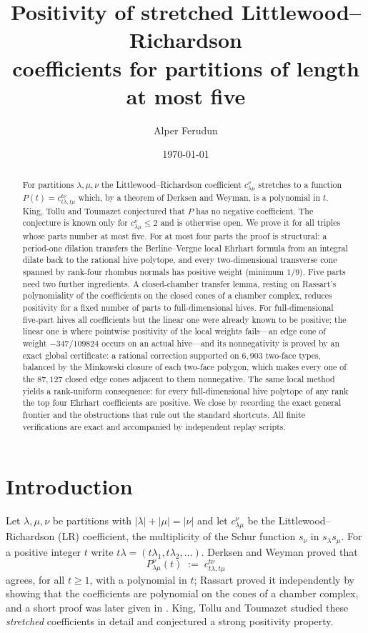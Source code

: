 \documentclass[11pt]{amsart}
\title[Stretched Littlewood--Richardson positivity, at most five parts]{Positivity of stretched Littlewood--Richardson\\ coefficients for partitions of length at most five}
\author{Alper Ferudun}
\date{\today}
\theoremstyle{definition}
\newcommand{\lam}{\lambda}
\begin{document}
\begin{abstract}
For partitions $\lam,\mu,\nu$ the Littlewood--Richardson coefficient
$c^{\nu}_{\lam\mu}$ stretches to a function $P(t)=c^{t\nu}_{t\lam,t\mu}$ which,
by a theorem of Derksen and Weyman, is a polynomial in $t$. King, Tollu and
Toumazet conjectured that $P$ has no negative coefficient. The conjecture is
known only for $c^{\nu}_{\lam\mu}\le 2$ and is otherwise open. We prove it for
all triples whose parts number at most five. For at most four parts the proof
is structural: a period-one dilation transfers the Berline--Vergne local Ehrhart
formula from an integral dilate back to the rational hive polytope, and every
two-dimensional transverse cone spanned by rank-four rhombus normals has
positive weight (minimum $1/9$). Five parts need two further ingredients. A
closed-chamber transfer lemma, resting on Rassart's polynomiality of the
coefficients on the closed cones of a chamber complex, reduces positivity for a
fixed number of parts to full-dimensional hives. For full-dimensional five-part
hives all coefficients but the linear one were already known to be positive;
the linear one is where pointwise positivity of the local weights fails---an
edge cone of weight $-347/109824$ occurs on an actual hive---and its
nonnegativity is proved by an exact global certificate: a rational correction
supported on $6{,}903$ two-face types, balanced by the Minkowski closure of each
two-face polygon, which makes every one of the $87{,}127$ closed edge cones
adjacent to them nonnegative. The same local method yields a rank-uniform
consequence: for every full-dimensional hive polytope of any rank the top four
Ehrhart coefficients are positive. We close by recording the exact general
frontier and the obstructions that rule out the standard shortcuts. All finite
verifications are exact and accompanied by independent replay scripts.
\end{abstract}

\maketitle

\section{Introduction}

Let $\lam,\mu,\nu$ be partitions with $|\lam|+|\mu|=|\nu|$ and let
$c^{\nu}_{\lam\mu}$ be the Littlewood--Richardson (LR) coefficient, the
multiplicity of the Schur function $s_\nu$ in $s_\lam s_\mu$. For a positive
integer $t$ write $t\lam=(t\lam_1,t\lam_2,\dots)$. Derksen and Weyman
\cite{DerksenWeyman} proved that
\[
  P^{\nu}_{\lam\mu}(t)\;:=\;c^{t\nu}_{t\lam,t\mu}
\]
agrees, for all $t\ge 1$, with a polynomial in $t$; Rassart \cite{Rassart}
proved it independently by showing that the coefficients are polynomial on the
cones of a chamber complex, and a short proof was later given in
\cite{ShortPoly}. King, Tollu and Toumazet \cite{KTT2004,KTT2006} studied these
\emph{stretched} coefficients in detail and conjectured a strong positivity
property.
\end{document}
